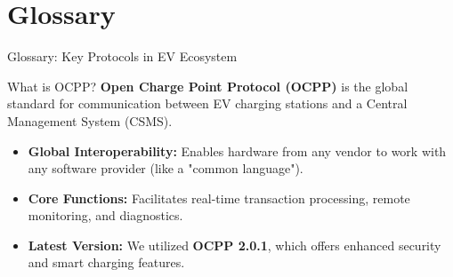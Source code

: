 \documentclass[11pt]{beamer}
\begin{document}
\section{Glossary} 
\begin{frame}{Glossary: Key Protocols in EV Ecosystem}
    \begin{block}{What is OCPP?}
        \textbf{Open Charge Point Protocol (OCPP)} is the global standard for communication between EV charging stations and a Central Management System (CSMS).
    \end{block}

    \begin{itemize}
        \item \textbf{Global Interoperability:} Enables hardware from any vendor to work with any software provider (like a "common language").
        \item \textbf{Core Functions:} Facilitates real-time transaction processing, remote monitoring, and diagnostics.
        \item \textbf{Latest Version:} We utilized \textbf{OCPP 2.0.1}, which offers enhanced security and smart charging features.
    \end{itemize}
\end{frame}        
\end{document}
